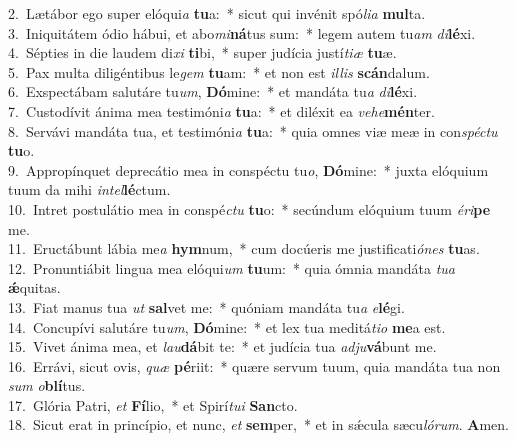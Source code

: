 {2.~}Lætábor ego super elóqui\textit{a} \textbf{tu}a:~* sicut qui invénit spó\textit{li}\textit{a} \textbf{mul}ta.\\
{3.~}Iniquitátem ódio hábui, et abo\textit{mi}\textbf{ná}tus sum:~* legem autem tu\textit{am} \textit{di}\textbf{lé}xi.\\
{4.~}Sépties in die laudem di\textit{xi} \textbf{ti}bi,~* super judícia justí\textit{ti}\textit{æ} \textbf{tu}æ.\\
{5.~}Pax multa diligéntibus le\textit{gem} \textbf{tu}am:~* et non est \textit{il}\textit{lis} \textbf{scán}dalum.\\
{6.~}Exspectábam salutáre tu\textit{um}, \textbf{Dó}mine:~* et mandáta tu\textit{a} \textit{di}\textbf{lé}xi.\\
{7.~}Custodívit ánima mea testimóni\textit{a} \textbf{tu}a:~* et diléxit ea \textit{ve}\textit{he}\textbf{mén}ter.\\
{8.~}Servávi mandáta tua, et testimóni\textit{a} \textbf{tu}a:~* quia omnes viæ meæ in con\textit{spé}\textit{ctu} \textbf{tu}o.\\
{9.~}Appropínquet deprecátio mea in conspéctu tu\textit{o}, \textbf{Dó}mine:~* juxta elóquium tuum da mihi \textit{in}\textit{tel}\textbf{lé}ctum.\\
{10.~}Intret postulátio mea in conspé\textit{ctu} \textbf{tu}o:~* secúndum elóquium tuum \textit{é}\textit{ri}\textbf{pe} me.\\
{11.~}Eructábunt lábia me\textit{a} \textbf{hym}num,~* cum docúeris me justificati\textit{ó}\textit{nes} \textbf{tu}as.\\
{12.~}Pronuntiábit lingua mea elóqui\textit{um} \textbf{tu}um:~* quia ómnia mandáta \textit{tu}\textit{a} \textbf{ǽ}quitas.\\
{13.~}Fiat manus tua \textit{ut} \textbf{sal}vet me:~* quóniam mandáta tu\textit{a} \textit{e}\textbf{lé}gi.\\
{14.~}Concupívi salutáre tu\textit{um}, \textbf{Dó}mine:~* et lex tua meditá\textit{ti}\textit{o} \textbf{me}a est.\\
{15.~}Vivet ánima mea, et \textit{lau}\textbf{dá}bit te:~* et judícia tua \textit{ad}\textit{ju}\textbf{vá}bunt me.\\
{16.~}Errávi, sicut ovis, \textit{quæ} \textbf{pé}riit:~* quære servum tuum, quia mandáta tua non \textit{sum} \textit{o}\textbf{blí}tus.\\
{17.~}Glória Patri, \textit{et} \textbf{Fí}lio,~* et Spirí\textit{tu}\textit{i} \textbf{San}cto.\\
{18.~}Sicut erat in princípio, et nunc, \textit{et} \textbf{sem}per,~* et in sǽcula sæcu\textit{ló}\textit{rum}. \textbf{A}men.\\
